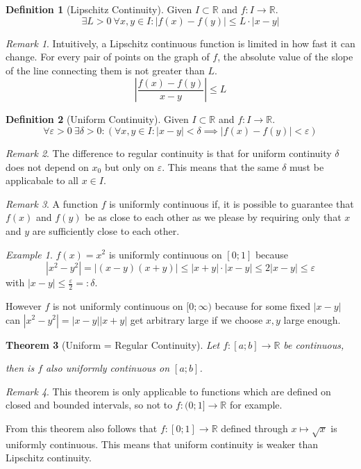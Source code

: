 \documentclass[english,titlepage]{uzhpub}
\theoremstyle{definition}
\newtheorem{definition}{Definition}[section]
\theoremstyle{plain}
\newtheorem{theorem}[definition]{Theorem} %
\theoremstyle{remark}
\newtheorem*{remark}{Remark}
\theoremstyle{example}
\newtheorem*{example}{Example}
\begin{document}
   \begin{definition}[Lipschitz Continuity]
      Given \(I \subset \mathbb{R}\) and \(f: I \to \mathbb{R}\).
      \[\exists L > 0~\forall x, y \in I: |f(x) - f(y)| \leq L \cdot |x - y|\]
   \end{definition}
   \begin{remark}
      Intuitively, a Lipschitz continuous function is limited in how fast it can change.
      For every pair of points on the graph of \(f\), the absolute value of the slope of the line connecting them is not greater than \(L\).
      \[\left|\frac{f(x) - f(y)}{x - y}\right| \leq L\]
   \end{remark}

   \begin{definition}[Uniform Continuity]
      Given \(I \subset \mathbb{R}\) and \(f: I \to \mathbb{R}\).
      \[\forall \varepsilon > 0~\exists \delta > 0: (\forall x,y \in I: |x - y| < \delta \implies |f(x) - f(y)| < \varepsilon)\]
   \end{definition}
   \begin{remark}
      The difference to regular continuity is that for uniform continuity \(\delta\) does not depend on \(x_0\) but only on \(\varepsilon\).
      This means that the same \(\delta\) must be applicabale to all \(x \in I\).
   \end{remark}
   \begin{remark}
      A function \(f\) is uniformly continuous if, it is possible to guarantee that \(f(x)\) and \(f(y)\) be as close to each other as we please by requiring only that \(x\) and \(y\) are sufficiently close to each other.
   \end{remark}
   \begin{example}
      \(f(x) = x^2\) is uniformly continuous on \([0; 1]\) because
      \[|x^2 - y^2| = |(x-y)(x+y)| \leq |x + y| \cdot |x - y| \leq 2|x - y| \leq \varepsilon\]
      with \(|x - y| \leq \frac{\varepsilon}{2} =: \delta\).

      However \(f\) is not uniformly continuous on \([0; \infty)\) because for some fixed \(|x - y|\) can \(|x^2 - y^2| = |x - y||x + y|\) get arbitrary large if we choose \(x, y\) large enough.
   \end{example}

   \begin{theorem}[Uniform = Regular Continuity]\label{thm:uniform=regular_cont}
      Let \(f: [a;b] \to \mathbb{R}\) be continuous,

      then is \(f\) also uniformly continuous on \([a;b]\).
   \end{theorem}
   \begin{remark}
      This theorem is only applicable to functions which are defined on closed and bounded intervals, so not to \(f: (0;1] \to \mathbb{R}\) for example.

      From this theorem also follows that \(f: [0; 1] \to \mathbb{R}\) defined through \(x \mapsto \sqrt{x}\) is uniformly continuous.
      This means that uniform continuity is weaker than Lipschitz continuity.
   \end{remark}
\end{document}
